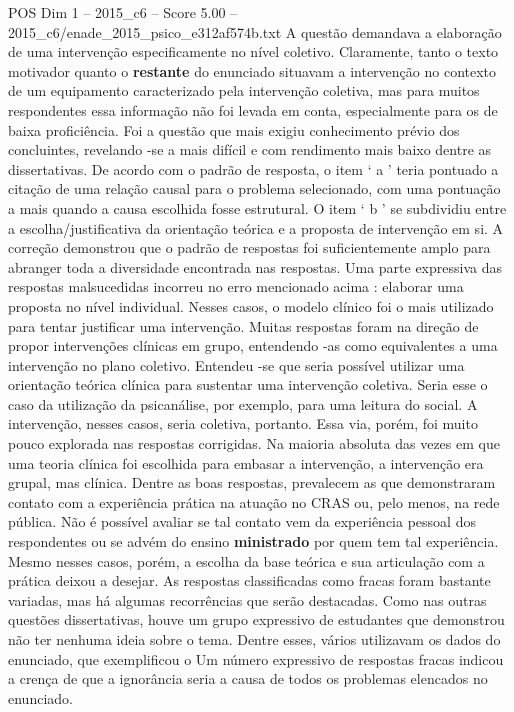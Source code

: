 \begin{textsample}{POS Dim 1 – 2015\_c6 – Score 5.00 – 2015\_c6/enade\_2015\_psico\_e312af574b.txt}
A questão demandava a elaboração de uma intervenção especificamente no nível coletivo.
Claramente, tanto o texto motivador quanto o \textbf{restante} do enunciado situavam a intervenção no contexto de um equipamento caracterizado pela intervenção coletiva, mas para muitos respondentes essa informação não foi levada em conta, especialmente para os de baixa proficiência.
Foi a questão que mais exigiu conhecimento prévio dos concluintes, revelando -se a mais difícil e com rendimento mais baixo dentre as dissertativas.
De acordo com o padrão de resposta, o item ‘ a ’ teria pontuado a citação de uma relação causal para o problema selecionado, com uma pontuação a mais quando a causa escolhida fosse estrutural.
O item ‘ b ’ se subdividiu entre a escolha/justificativa da orientação teórica e a proposta de intervenção em si.
A correção demonstrou que o padrão de respostas foi suficientemente amplo para abranger toda a diversidade encontrada nas respostas.
Uma parte expressiva das respostas malsucedidas incorreu no erro mencionado acima : elaborar uma proposta no nível individual.
Nesses casos, o modelo clínico foi o mais utilizado para tentar justificar uma intervenção.
Muitas respostas foram na direção de propor intervenções clínicas em grupo, entendendo -as como equivalentes a uma intervenção no plano coletivo.
Entendeu -se que seria possível utilizar uma orientação teórica clínica para sustentar uma intervenção coletiva.
Seria esse o caso da utilização da psicanálise, por exemplo, para uma leitura do social.
A intervenção, nesses casos, seria coletiva, portanto.
Essa via, porém, foi muito pouco explorada nas respostas corrigidas.
Na maioria absoluta das vezes em que uma teoria clínica foi escolhida para embasar a intervenção, a intervenção era grupal, mas clínica.
Dentre as boas respostas, prevalecem as que demonstraram contato com a experiência prática na atuação no CRAS ou, pelo menos, na rede pública.
Não é possível avaliar se tal contato vem da experiência pessoal dos respondentes ou se advém do ensino \textbf{ministrado} por quem tem tal experiência.
Mesmo nesses casos, porém, a escolha da base teórica e sua articulação com a prática deixou a desejar.
As respostas classificadas como fracas foram bastante variadas, mas há algumas recorrências que serão destacadas.
Como nas outras questões dissertativas, houve um grupo expressivo de estudantes que demonstrou não ter nenhuma ideia sobre o tema.
Dentre esses, vários utilizavam os dados do enunciado, que exemplificou o Um número expressivo de respostas fracas indicou a crença de que a ignorância seria a causa de todos os problemas elencados no enunciado.

\end{textsample}
